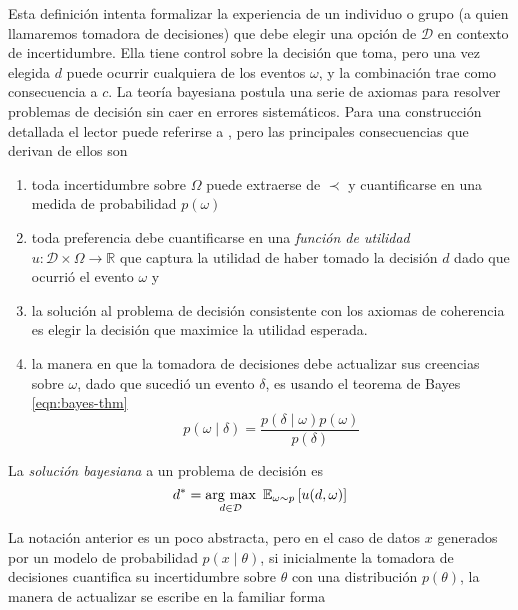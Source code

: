 \documentclass[main.tex]{subfiles}
\begin{document}
Esta definición intenta formalizar la experiencia de un individuo o grupo (a quien llamaremos tomadora de decisiones) que debe elegir una opción de $\mathcal{D}$ en contexto de incertidumbre. Ella tiene control sobre la decisión que toma, pero una vez elegida $d$ puede ocurrir cualquiera de los eventos $\omega$, y la combinación trae como consecuencia a $c$. La teoría bayesiana postula una serie de axiomas para resolver problemas de decisión sin caer en errores sistemáticos. Para una construcción detallada el lector puede referirse a \cite{bernardo}, pero las principales consecuencias que derivan de ellos son
\begin{enumerate}[label=\roman*]
	\item toda incertidumbre sobre $\Omega$ puede extraerse de $\prec$ y cuantificarse en una medida de probabilidad $p(\omega)$
	\item toda preferencia debe cuantificarse en una \textit{función de utilidad} \\  $u: \mathcal{D}\times\Omega \to \mathbb{R}$  que captura la utilidad de haber tomado la decisión $d$ dado que ocurrió el evento   $\omega$ y
	\item la solución al problema de decisión consistente con los axiomas de coherencia es elegir la decisión que maximice la utilidad esperada.
	\item la manera en que la tomadora de decisiones debe actualizar sus creencias sobre $\omega$, dado que sucedió un evento $\delta$, es usando el teorema de Bayes \eqref{eqn:bayes-thm}
		\begin{equation*}
		p(\omega\mid\delta) = \frac{p(\delta\mid\omega)p(\omega)}{p(\delta)}
		\end{equation*}

\end{enumerate}

\begin{definition}
	La \textit{solución bayesiana} a un problema de decisión es 
	\begin{equation}
	d^* = \argmax_{d \in\mathcal{D}} \ \mathbb{E}_{\omega\sim p}\left[u(d, \omega)\right]
	\end{equation}
\end{definition}

La notación anterior es un poco abstracta, pero en el caso de datos $x$ generados por un modelo de probabilidad $p(x \mid \theta)$, si inicialmente la tomadora de decisiones cuantifica su incertidumbre sobre $\theta$ con una distribución $p(\theta)$, la manera de actualizar se escribe en la familiar forma
\end{document}
